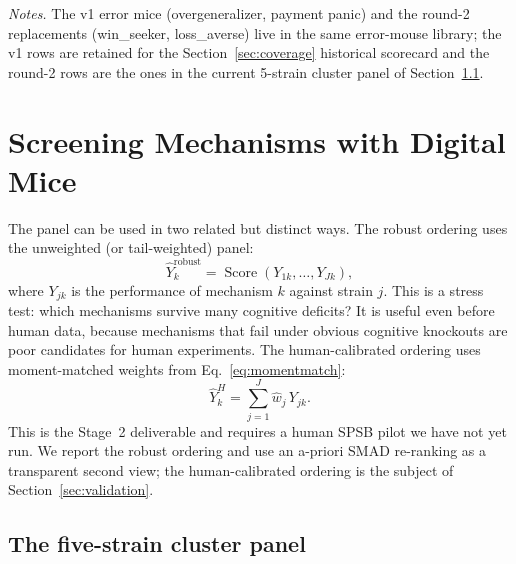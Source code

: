 \documentclass[12pt]{article}
\newcommand{\SPSB}{SPSB}
\begin{document}
\begin{table}[t]
\vspace{0.4em}
\begin{minipage}{0.95\textwidth}
\footnotesize\textit{Notes.} The v1 error mice
(overgeneralizer, payment panic) and the round-2 replacements
(win\_seeker, loss\_averse) live in the same error-mouse library;
the v1 rows are retained for the Section~\ref{sec:coverage}
historical scorecard and the round-2 rows are the ones in the
current 5-strain cluster panel of
Section~\ref{sec:cluster-panel}.\par
\end{minipage}
\end{table}

\section{Screening Mechanisms with Digital Mice}
\label{sec:screen}

The panel can be used in two related but distinct ways. The robust
ordering uses the unweighted (or tail-weighted) panel:
\begin{equation}
\widehat{Y}^{\mathrm{robust}}_k
=
\operatorname{Score}\!
\left(
Y_{1k},\ldots,Y_{Jk}
\right),
\label{eq:robust}
\end{equation}
where $Y_{jk}$ is the performance of mechanism $k$ against strain
$j$. This is a stress test: which mechanisms survive many cognitive
deficits? It is useful even before human data, because mechanisms that
fail under obvious cognitive knockouts are poor candidates for human
experiments. The human-calibrated ordering uses moment-matched
weights from Eq.~\eqref{eq:momentmatch}:
\begin{equation}
\widehat{Y}^{H}_k
=
\sum_{j=1}^{J} \widehat{w}_j\, Y_{jk}.
\label{eq:humanpred}
\end{equation}
This is the Stage~2 deliverable and requires a human \SPSB{} pilot we
have not yet run. We report the robust ordering and use an a-priori
SMAD re-ranking as a transparent second view; the human-calibrated
ordering is the subject of Section~\ref{sec:validation}.

\subsection{The five-strain cluster panel}
\label{sec:cluster-panel}
\end{document}
